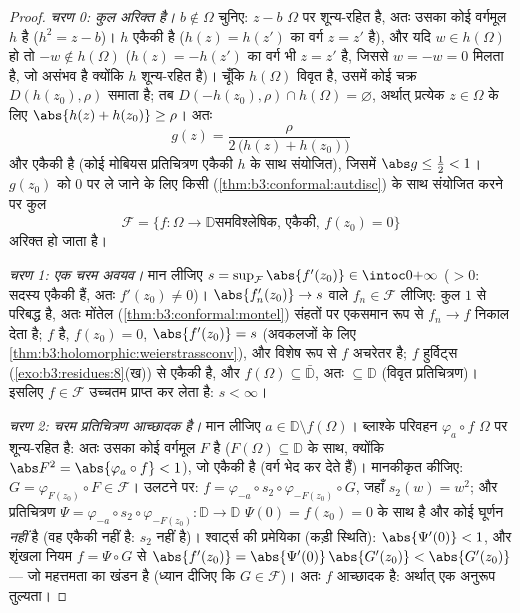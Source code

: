 \begin{proof}
\emph{चरण 0: कुल अरिक्त है।} $b \notin \Omega$ चुनिए: $z - b$ $\Omega$ पर
शून्य-रहित है, अतः उसका कोई  वर्गमूल $h$ है ($h^2 = z - b$)।
$h$ एकैकी है ($h(z) =
h(z')$ का वर्ग $z = z'$ है), और यदि $w \in h(\Omega)$ हो तो
$-w
\notin h(\Omega)$ ($h(z) = -h(z')$ का वर्ग भी $z = z'$ है, जिससे $w = -w = 0$ मिलता है, जो असंभव
है क्योंकि $h$ शून्य-रहित है)। चूँकि $h(\Omega)$ विवृत है, उसमें कोई
चक्र $D(h(z_0), \rho)$ समाता है; तब $D(-h(z_0), \rho) \cap h(\Omega) = \varnothing$, अर्थात् प्रत्येक $z \in \Omega$ के लिए
$\abs{h(z) + h(z_0)} \geq \rho$। अतः
\[
g(z) = \frac{\rho}{2\,\bigl(h(z) + h(z_0)\bigr)}
\]
 और एकैकी है (कोई मोबियस प्रतिचित्रण एकैकी $h$ के
साथ संयोजित), जिसमें $\abs g \leq \frac12 < 1$। $g(z_0)$ को $0$ पर ले जाने के लिए
किसी  (\cref{thm:b3:conformal:autdisc}) के साथ संयोजित करने पर कुल
\[
\mathcal F = \{f \colon \Omega \to \mathbb D \text{
समविश्लेषिक, एकैकी, } f(z_0) = 0\}
\]
अरिक्त हो जाता है।

\emph{चरण 1: एक चरम अवयव।} मान लीजिए $s =
\sup_{\mathcal F}\abs{f'(z_0)} \in \intoc0{+\infty}$ ($> 0$: सदस्य एकैकी
हैं, अतः $f'(z_0) \neq 0$)। $\abs{f_n'(z_0)} \to s$ वाले $f_n \in
\mathcal F$ लीजिए: कुल $1$ से परिबद्ध है,
अतः मोंतेल (\cref{thm:b3:conformal:montel}) संहतों पर एकसमान रूप से $f_n \to f$ निकाल देता है;
$f$  है, $f(z_0) = 0$, $\abs{f'(z_0)} = s$ (अवकलजों के लिए \cref{thm:b3:holomorphic:weierstrassconv}), और
विशेष रूप से $f$ अचरेतर है; $f$ हुर्विट्स (\cref{exo:b3:residues:8}(ख)) से एकैकी
है, और $f(\Omega) \subseteq \bar{\mathbb D}$, अतः $\subseteq
\mathbb D$ (विवृत प्रतिचित्रण)। इसलिए $f \in \mathcal F$ उच्चतम
प्राप्त कर लेता है: $s < \infty$।

\emph{चरण 2: चरम प्रतिचित्रण आच्छादक है।} मान लीजिए $a \in
\mathbb D\setminus f(\Omega)$।
ब्लाश्के परिवहन $\varphi_a\circ f$  $\Omega$ पर शून्य-रहित है: अतः उसका
कोई  वर्गमूल $F$ है ($F(\Omega) \subseteq \mathbb D$ के साथ, क्योंकि $\abs F^2 =
\abs{\varphi_a\circ f} < 1$),
जो एकैकी है (वर्ग भेद कर देते हैं)। मानकीकृत कीजिए: $G = \varphi_{F(z_0)}\circ F \in
\mathcal F$। उलटने
पर: $f = \varphi_{-a}\circ s_2 \circ
\varphi_{-F(z_0)}\circ G$, जहाँ $s_2(w) = w^2$; और प्रतिचित्रण $\Psi
= \varphi_{-a}\circ s_2\circ\varphi_{-F(z_0)} \colon \mathbb D
\to \mathbb D$ $\Psi(0) = f(z_0) = 0$ के साथ
 है और कोई घूर्णन \emph{नहीं} है (वह एकैकी नहीं है:
$s_2$ नहीं है)। श्वार्ट्स की प्रमेयिका (कड़ी स्थिति): $\abs{\Psi'(0)} < 1$, और
शृंखला नियम $f = \Psi\circ G$ से $\abs{f'(z_0)} =
\abs{\Psi'(0)}\,\abs{G'(z_0)} < \abs{G'(z_0)}$ --- जो महत्तमता का खंडन है (ध्यान
दीजिए कि $G \in \mathcal F$)। अतः $f$ आच्छादक है: अर्थात् एक अनुरूप तुल्यता।


\end{proof}
